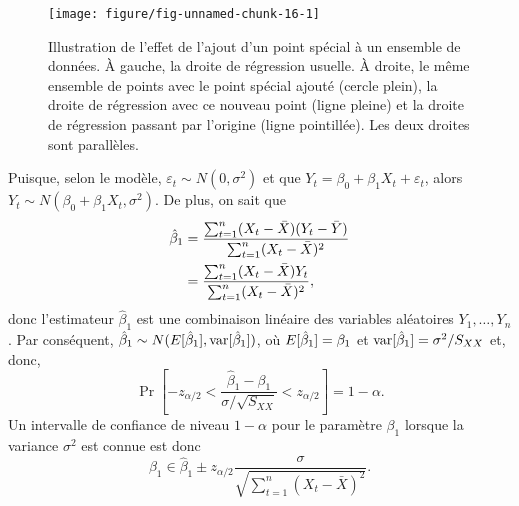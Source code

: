 \begin{solution}{2.10}
    \begin{figure}
      \centering
\begin{knitrout}
\color{fgcolor}

{\centering \texttt{[image: figure/fig-unnamed-chunk-16-1]}

}



\end{knitrout}
      \caption{Illustration de l'effet de l'ajout d'un point spécial à
        un ensemble de données. À gauche, la droite de régression
        usuelle. À droite, le même ensemble de points avec le point
        spécial ajouté (cercle plein), la droite de régression avec ce
        nouveau point (ligne pleine) et la droite de régression
        passant par l'origine (ligne pointillée). Les deux droites
        sont parallèles.}
      \label{fig:simple:pointmagique}
    \end{figure}
  
\end{solution}
\begin{solution}{2.11}
    Puisque, selon le modèle, $\varepsilon_t \sim N(0, \sigma^2)$ et
    que $Y_t = \beta_0 + \beta_1 X_t + \varepsilon_t$, alors $Y_t \sim
    N(\beta_0 + \beta_1 X_t, \sigma^2)$. De plus, on sait que
    \begin{align*}
      \hat{\beta}_1
      &= \frac{\sum_{t=1}^n (X_t - \bar{X})(Y_t - \bar{Y})}{%
        \sum_{t=1}^n (X_t - \bar{X})^2} \\
      &= \frac{\sum_{t=1}^n (X_t - \bar{X}) Y_t}{%
        \sum_{t=1}^n (X_t - \bar{X})^2},
    \end{align*}
    donc l'estimateur $\hat{\beta}_1$ est une combinaison linéaire des
    variables aléatoires $Y_1, \dots, Y_n$. Par conséquent,
    $\hat{\beta}_1 \sim N(E [ \hat{\beta}_1 ], \mathrm{var} [ \hat{\beta}_1 ])$,
    où $E [ \hat{\beta}_1 ] = \beta_1$ et $\mathrm{var} [ \hat{\beta}_1 ] =
    \sigma^2/S_{XX}$ et, donc,
    \begin{displaymath}
      \Pr
      \left[
        -z_{\alpha/2} <
        \frac{\hat{\beta}_1 - \beta_1}{\sigma/\sqrt{S_{XX}}} <
        z_{\alpha/2}
      \right] = 1 - \alpha.
    \end{displaymath}
    Un intervalle de confiance de niveau $1 - \alpha$ pour le
    paramètre $\beta_1$ lorsque la variance $\sigma^2$ est connue est donc
    \begin{displaymath}
      \beta_1 \in \hat{\beta}_1 \pm z_{\alpha/2}
      \frac{\sigma}{\sqrt{\sum_{t=1}^n (X_t - \bar{X})^2}}.
    \end{displaymath}
  
\end{solution}

